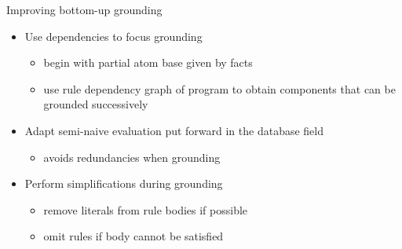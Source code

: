 \begin{frame}{Improving bottom-up grounding}
  \bigskip
  \begin{itemize}
  \item Use dependencies to \alert{focus} grounding
    \begin{itemize}\normalsize
    \item begin with partial atom base given by facts
    \item use rule dependency graph of program to obtain \alert{components} that can be \alert{grounded successively}
    \end{itemize}
    \medskip
  \item Adapt \alert{semi-naive evaluation} put forward in the database field
    \begin{itemize}\normalsize
    \item avoids redundancies when grounding
    \end{itemize}
    \medskip
  \item Perform \alert{simplifications} during grounding
    \begin{itemize}\normalsize
    \item remove literals from rule bodies if possible
    \item omit rules if body cannot be satisfied
    \end{itemize}
  \end{itemize}
\end{frame}
